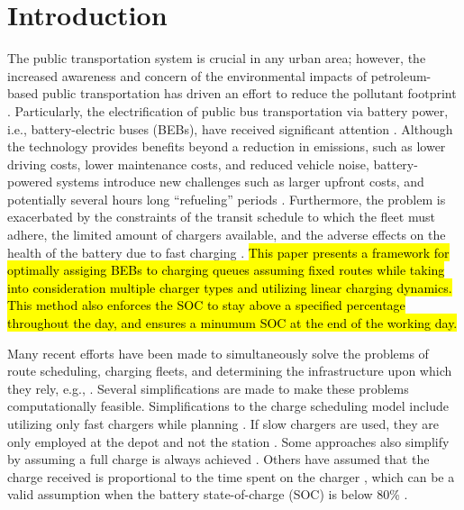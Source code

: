 \documentclass[utf8]{FrontiersinHarvard}
\let\cite\citep                                       %
\begin{document}
\section{Introduction}
\label{sec:introduction}
The public transportation system is crucial in any urban area; however, the increased awareness and concern of the
environmental impacts of petroleum-based public transportation has driven an effort to reduce the pollutant footprint
\cite{de-2014-simul-elect,xylia-2018-role-charg,guida-2017-zeeus-repor-europ,li-2016-batter-elect}. Particularly,
the electrification of public bus transportation via battery power, i.e., battery-electric buses (BEBs), have received
significant attention \cite{li-2016-batter-elect}. Although the technology provides benefits beyond a reduction in
emissions, such as lower driving costs, lower maintenance costs, and reduced vehicle noise, battery-powered systems
introduce new challenges such as larger upfront costs, and potentially several hours long ``refueling'' periods
\cite{xylia-2018-role-charg,li-2016-batter-elect}. Furthermore, the problem is exacerbated by the constraints of the
transit schedule to which the fleet must adhere, the limited amount of chargers available, and the adverse effects on
the health of the battery due to fast charging \cite{lutsey-2019-updat-elect}. \hl{This paper presents a framework for optimally assiging BEBs to charging queues assuming fixed routes while taking into consideration multiple charger types and utilizing linear charging dynamics. This method also enforces the SOC to stay above a specified percentage throughout the day, and ensures a minumum SOC at the end of the working day.}

Many recent efforts have been made to simultaneously solve the problems of route scheduling, charging fleets, and
determining the infrastructure upon which they rely, e.g., \cite{wei-2018-optim-spatio,sebastiani-2016-evaluat-elect,hoke-2014-accoun-lithium,wang-2017-elect-vehic}. Several simplifications are made to make these problems
computationally feasible. Simplifications to the charge scheduling model include utilizing only fast chargers while
planning \cite{wei-2018-optim-spatio,sebastiani-2016-evaluat-elect,wang-2017-optim-rechar,zhou-2020-bi-objec,yang-2018-charg-sched,wang-2017-elect-vehic,qin-2016-numer-analy,liu-2020-batter-elect}. If slow chargers are used,
they are only employed at the depot and not the station \cite{he-2020-optim-charg,tang-2019-robus-sched}. Some
approaches also simplify by assuming a full charge is always achieved
\cite{wei-2018-optim-spatio,wang-2017-elect-vehic,zhou-2020-bi-objec,wang-2017-optim-rechar}. Others have assumed
that the charge received is proportional to the time spent on the charger
\cite{liu-2020-batter-elect,yang-2018-charg-sched}, which can be a valid assumption when the battery state-of-charge
(SOC) is below 80\% \cite{liu-2020-batter-elect}.
\end{document}
